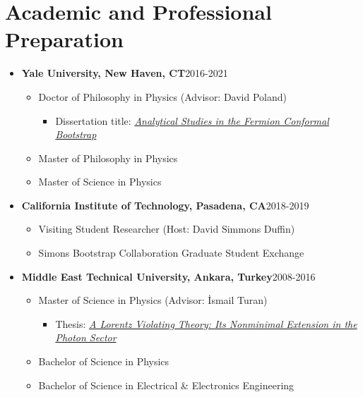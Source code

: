 \documentclass[a4paper,11pt]{article}
\begin{document}
\section{\textcolor{burntorange}{Academic and Professional Preparation}}
\begin{itemize}[noitemsep,nolistsep] 
	\item[] \textbf{Yale University, New Haven, CT}\hfill 2016-2021
	\vspace*{-.5em}
	\begin{itemize}
		\item[] Doctor of Philosophy in Physics \hfill (Advisor: David Poland)\hspace*{2.2em}\vspace*{-.5em}
		\begin{itemize}
			\item[] Dissertation title: \hyperref{https://www.proquest.com/docview/2557212384/4B6B347681464779PQ/1}{}{}{\emph{Analytical Studies in the Fermion Conformal Bootstrap}}\vspace*{-.5em}
		\end{itemize}
		\item[] Master of Philosophy in Physics\vspace*{-.5em}
		\item[]Master of Science in Physics
	\end{itemize} 
	\item[] \textbf{California Institute of Technology, Pasadena, CA}\hfill 2018-2019
	\vspace*{-.5em}
\begin{itemize}
	\item[] Visiting Student Researcher \hfill (Host: David Simmons Duffin)\hspace*{2.2em}\vspace*{-.5em}
	\item[] Simons Bootstrap Collaboration Graduate Student Exchange
\end{itemize} 
	\item[] \textbf{Middle East Technical University, Ankara, Turkey}\hfill 2008-2016
\vspace*{-.5em}
\begin{itemize}
	\item[] Master of Science in Physics \hfill (Advisor: İsmail Turan)\hspace*{2.2em}\vspace*{-.5em}
	\begin{itemize}
		\item[] Thesis: \hyperref{https://hdl.handle.net/11511/25431 }{}{}{\emph{A Lorentz Violating Theory: Its Nonminimal Extension in the Photon Sector}}\vspace*{-.5em}
	\end{itemize}
	\item[] Bachelor of Science in Physics\vspace*{-.5em}
	\item[] Bachelor of Science in Electrical \& Electronics Engineering
\end{itemize} 
\end{itemize}
\end{document}
